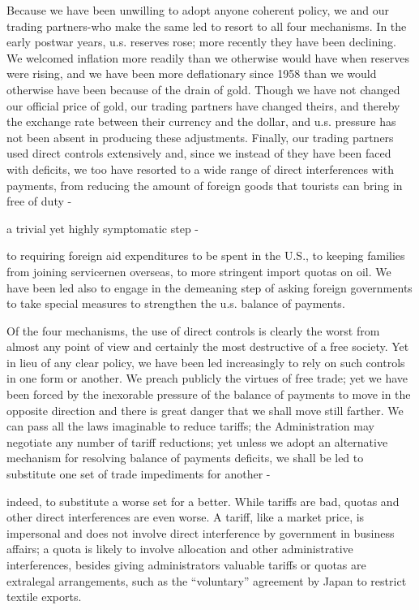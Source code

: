 \documentclass[11pt,openany]{book}
\begin{document}
Because we have been unwilling to adopt anyone coherent policy, we and our trading partners-who make the same led to resort to all four mechanisms. In the early postwar years, u.s. reserves rose; more recently they have been declining. We welcomed inflation more readily than we otherwise would have when reserves were rising, and we have been more deflationary since 1958 than we would otherwise have been because of the drain of gold. Though we have not changed our official price of gold, our trading partners have changed theirs, and thereby the exchange rate between their currency and the dollar, and u.s. pressure has not been absent in producing these adjustments. Finally, our trading partners used direct controls extensively and, since we instead of they have been faced with deficits, we too have resorted to a wide range of direct interferences with payments, from reducing the amount of foreign goods that tourists can bring in free of duty -

a trivial yet highly symptomatic step -

to requiring foreign aid expenditures to be spent in the U.S., to keeping families from joining servicernen overseas, to more stringent import quotas on oil. We have been led also to engage in the demeaning step of asking foreign governments to take special measures to strengthen the u.s. balance of payments.

Of the four mechanisms, the use of direct controls is clearly the worst from almost any point of view and certainly the most destructive of a free society. Yet in lieu of any clear policy, we have been led increasingly to rely on such controls in one form or another. We preach publicly the virtues of free trade; yet we have been forced by the inexorable pressure of the balance of payments to move in the opposite direction and there is great danger that we shall move still farther. We can pass all the laws imaginable to reduce tariffs; the Administration may negotiate any number of tariff reductions; yet unless we adopt an alternative mechanism for resolving balance of payments deficits, we shall be led to substitute one set of trade impediments for another -

indeed, to substitute a worse set for a better. While tariffs are bad, quotas and other direct interferences are even worse. A tariff, like a market price, is impersonal and does not involve direct interference by government in business affairs; a quota is likely to involve allocation and other administrative interferences, besides giving administrators valuable tariffs or quotas are extralegal arrangements, such as the ``voluntary'' agreement by Japan to restrict textile exports.
\end{document}
